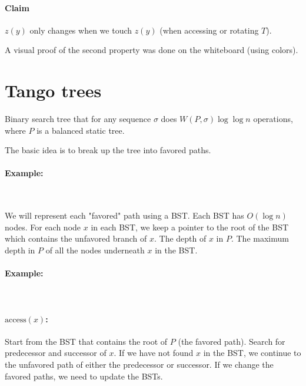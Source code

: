 \documentclass[a4paper]{article}
\begin{document}
\paragraph{Claim}
$z(y)$ only changes when we touch $z(y)$ (when accessing or rotating $T$).

A visual proof of the second property was done on the whiteboard (using colors).

\section{Tango trees}
Binary search tree that for any sequence $\sigma$ does $W(P, \sigma) \log \log n$ operations, where $P$ is a balanced static tree.

The basic idea is to break up the tree into favored paths.

\paragraph{Example:}\ \\

We will represent each "favored" path using a BST. Each BST has $O(\log n)$ nodes.
For each node $x$ in each BST, we keep a pointer to the root of the BST which contains the unfavored branch of $x$.
The depth of $x$ in $P$.
The maximum depth in $P$ of all the nodes underneath $x$ in the BST.

\paragraph{Example:}\ \\

\paragraph{$\text{access}(x)$:}
Start from the BST that contains the root of $P$ (the favored path).
Search for predecessor and successor of $x$.
If we have not found $x$ in the BST, we continue to the unfavored path of either the predecessor or successor.
If we change the favored paths, we need to update the BSTs.
\end{document}
